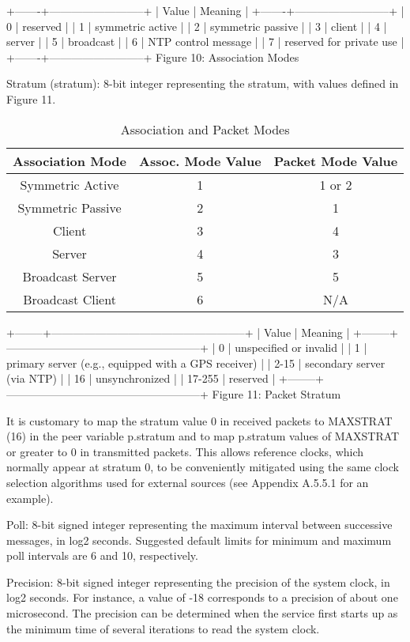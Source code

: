 +-------+--------------------------+
| Value | Meaning |
+-------+--------------------------+
| 0 | reserved |
| 1 | symmetric active |
| 2 | symmetric passive |
| 3 | client |
| 4 | server |
| 5 | broadcast |
| 6 | NTP control message |
| 7 | reserved for private use |
+-------+--------------------------+
Figure 10: Association Modes

Stratum (stratum): 8-bit integer representing the stratum, with
values defined in Figure 11.

\begin{table}[htb]
\center
\begin{tabular}{c | c | c}
Association Mode & Assoc. Mode Value & Packet Mode Value \\
\hline
\hline
Symmetric Active & 1 & 1 or 2 \\
Symmetric Passive & 2 & 1 \\
Client & 3 & 4 \\
Server & 4 & 3 \\
Broadcast Server & 5 & 5 \\
Broadcast Client & 6 & N/A \\
\hline
\end{tabular}
\label{association_and_packet_modes}
\caption{Association and Packet Modes}
\end{table}

+--------+-----------------------------------------------------+
| Value | Meaning |
+--------+-----------------------------------------------------+
| 0 | unspecified or invalid |
| 1 | primary server (e.g., equipped with a GPS receiver) |
| 2-15 | secondary server (via NTP) |
| 16 | unsynchronized |
| 17-255 | reserved |
+--------+-----------------------------------------------------+
Figure 11: Packet Stratum

It is customary to map the stratum value 0 in received packets to
MAXSTRAT (16) in the peer variable p.stratum and to map p.stratum
values of MAXSTRAT or greater to 0 in transmitted packets. This
allows reference clocks, which normally appear at stratum 0, to be
conveniently mitigated using the same clock selection algorithms used
for external sources (see Appendix A.5.5.1 for an example).

Poll: 8-bit signed integer representing the maximum interval between
successive messages, in log2 seconds. Suggested default limits for
minimum and maximum poll intervals are 6 and 10, respectively.

Precision: 8-bit signed integer representing the precision of the
system clock, in log2 seconds. For instance, a value of -18
corresponds to a precision of about one microsecond. The precision
can be determined when the service first starts up as the minimum
time of several iterations to read the system clock.

